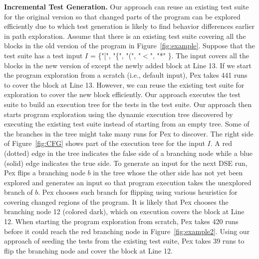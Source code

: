 \textbf{Incremental Test Generation.} Our approach can reuse an existing
test suite for the original version so that changed parts of the program can be explored
efficiently due to which test generation is likely to find behavior
differences earlier in path exploration. Assume that there is an existing test suite covering all the blocks in the old version of the program in Figure~\ref{fig:example}. Suppose that the test suite has a test input $I$ = \{"[", "\{", "(", "$<$", "*" \}. The input covers all the blocks in the new version of  except the newly added block at Line 13. If we start the program exploration from a scratch (i.e., default input), Pex takes 441 runs to cover the block at Line 13. However, we can reuse the existing test suite for exploration to cover the new block efficiently. Our approach executes the test suite to build an execution tree for the tests in the test suite. Our approach then starts program exploration using the dynamic execution tree discovered by executing the existing test suite instead of starting from an empty tree. Some of the branches in the tree might take many runs for Pex to discover. The right side of Figure~\ref{fig:CFG} shows part of the execution tree for the input $I$. A red (dotted) edge in the tree indicates the false side of a branching node while a blue (solid) edge indicates the true side. To generate an input for the next DSE run, Pex flips a branching node $b$ in the tree whose the other side has not yet been explored and generates an input so that program execution takes the unexplored branch of $b$. Pex chooses such branch for flipping using various heuristics for covering changed regions of the program. It is likely that Pex chooses the branching node 12 (colored dark), which on execution covers the block at Line 12. When starting the program exploration from scratch, Pex takes 420 runs before it could reach the red branching node in Figure~\ref{fig:example2}. Using our approach of seeding the tests from the existing test suite, Pex takes 39 runs to flip the branching node and cover the block at Line 12.






